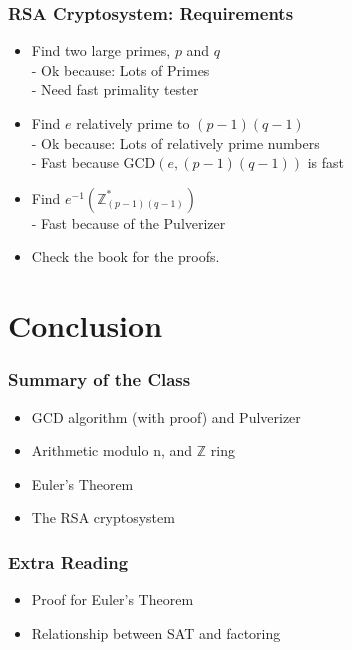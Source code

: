 \documentclass{beamer}
\begin{document}
\begin{frame}
  \frametitle{RSA Cryptosystem: Requirements}

  {\larger
    \begin{itemize}
    \item Find two large primes, $p$ and $q$\\
      - Ok because: Lots of Primes\\
      - Need fast primality tester\\

      \bigskip
      
    \item Find $e$ relatively prime to $(p-1)(q-1)$\\
      - Ok because: Lots of relatively prime numbers\\
      - Fast because GCD$(e,(p-1)(q-1))$ is fast\\

      \bigskip
      
    \item Find $e^{-1} (\mathbb{Z}^*_{(p-1)(q-1)})$\\
      - Fast because of the Pulverizer

      \bigskip

    \item Check the book for the proofs.
    \end{itemize}    
  }
\end{frame}

\section{Conclusion}

\begin{frame}
  \frametitle{Summary of the Class}

  {\larger
    \begin{itemize}
    \item GCD algorithm (with proof) and Pulverizer

      \bigskip
      
    \item Arithmetic modulo n, and $\mathbb{Z}$ ring

      \bigskip

    \item Euler's Theorem
      
      \bigskip
      
    \item The RSA cryptosystem
    \end{itemize}
  }
\end{frame}

\begin{frame}
  \frametitle{Extra Reading}

  {\larger

    \begin{itemize}
    \item Proof for Euler's Theorem
      \vfill

    \item Relationship between SAT and factoring
    \end{itemize}
  }
  
\end{frame}
\end{document}
